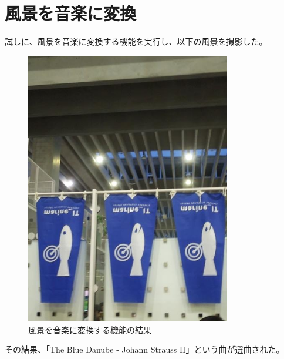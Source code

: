 \section{風景を音楽に変換}
試しに、風景を音楽に変換する機能を実行し、以下の風景を撮影した。
\begin{figure}[h]
  \centering
  \includegraphics[width=0.8\textwidth]{pages/report/images/picture.jpg}
  \caption{風景を音楽に変換する機能の結果}
  \label{fig:landscape-to-music}
\end{figure}
その結果、「The Blue Danube - Johann Strauss II」という曲が選曲された。

